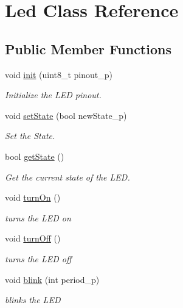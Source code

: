 \hypertarget{class_led}{}\section{Led Class Reference}
\label{class_led}
\subsection*{Public Member Functions}
\begin{DoxyCompactItemize}
\item 
void \hyperlink{class_led_a4bce8445a80436df1126471f83b0fb17}{init} (uint8\+\_\+t pinout\+\_\+p)
\begin{DoxyCompactList}\small\item\em Initialize the L\+ED pinout. \end{DoxyCompactList}\item 
void \hyperlink{class_led_a9136de456f7df8e202e880312767a566}{set\+State} (bool new\+State\+\_\+p)
\begin{DoxyCompactList}\small\item\em Set the State. \end{DoxyCompactList}\item 
bool \hyperlink{class_led_a3c98242eb57df713fcb8d441d43ccd02}{get\+State} ()
\begin{DoxyCompactList}\small\item\em Get the current state of the L\+ED. \end{DoxyCompactList}\item 
\mbox{\label{class_led_a02561ef42927779f247c0ae714a89e9a}} 
void \hyperlink{class_led_a02561ef42927779f247c0ae714a89e9a}{turn\+On} ()
\begin{DoxyCompactList}\small\item\em turns the L\+ED on \end{DoxyCompactList}\item 
\mbox{\label{class_led_a3c581311221a0fedafdfb250a1f318ab}} 
void \hyperlink{class_led_a3c581311221a0fedafdfb250a1f318ab}{turn\+Off} ()
\begin{DoxyCompactList}\small\item\em turns the L\+ED off \end{DoxyCompactList}\item 
void \hyperlink{class_led_af71542a417a5209b4fccbf8b07ec1f24}{blink} (int period\+\_\+p)
\begin{DoxyCompactList}\small\item\em blinks the L\+ED \end{DoxyCompactList}\end{DoxyCompactItemize}


